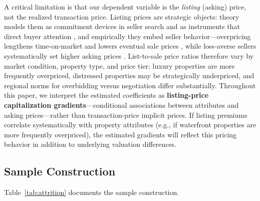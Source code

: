 A critical limitation is that our dependent variable is the \textit{listing} (asking) price, not the realized transaction price. Listing prices are strategic objects: theory models them as commitment devices in seller search \citep{horowitz1992role} and as instruments that direct buyer attention \citep{han2016role}, and empirically they embed seller behavior---overpricing lengthens time-on-market and lowers eventual sale prices \citep{knight2002listing}, while loss-averse sellers systematically set higher asking prices \citep{genesove2001loss}. List-to-sale price ratios therefore vary by market condition, property type, and price tier: luxury properties are more frequently overpriced, distressed properties may be strategically underpriced, and regional norms for overbidding versus negotiation differ substantially. Throughout this paper, we interpret the estimated coefficients as \textbf{listing-price capitalization gradients}---conditional associations between attributes and asking prices---rather than transaction-price implicit prices. If listing premiums correlate systematically with property attributes (e.g., if waterfront properties are more frequently overpriced), the estimated gradients will reflect this pricing behavior in addition to underlying valuation differences.

\subsection{Sample Construction}

Table~\ref{tab:attrition} documents the sample construction.


